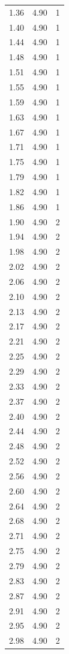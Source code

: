 \begin{longtable}{lrr}
  1.36 & 4.90 & 1 \\
  1.40 & 4.90 & 1 \\
  1.44 & 4.90 & 1 \\
  1.48 & 4.90 & 1 \\
  1.51 & 4.90 & 1 \\
  1.55 & 4.90 & 1 \\
  1.59 & 4.90 & 1 \\
  1.63 & 4.90 & 1 \\
  1.67 & 4.90 & 1 \\
  1.71 & 4.90 & 1 \\
  1.75 & 4.90 & 1 \\
  1.79 & 4.90 & 1 \\
  1.82 & 4.90 & 1 \\
  1.86 & 4.90 & 1 \\
  1.90 & 4.90 & 2 \\
  1.94 & 4.90 & 2 \\
  1.98 & 4.90 & 2 \\
  2.02 & 4.90 & 2 \\
  2.06 & 4.90 & 2 \\
  2.10 & 4.90 & 2 \\
  2.13 & 4.90 & 2 \\
  2.17 & 4.90 & 2 \\
  2.21 & 4.90 & 2 \\
  2.25 & 4.90 & 2 \\
  2.29 & 4.90 & 2 \\
  2.33 & 4.90 & 2 \\
  2.37 & 4.90 & 2 \\
  2.40 & 4.90 & 2 \\
  2.44 & 4.90 & 2 \\
  2.48 & 4.90 & 2 \\
  2.52 & 4.90 & 2 \\
  2.56 & 4.90 & 2 \\
  2.60 & 4.90 & 2 \\
  2.64 & 4.90 & 2 \\
  2.68 & 4.90 & 2 \\
  2.71 & 4.90 & 2 \\
  2.75 & 4.90 & 2 \\
  2.79 & 4.90 & 2 \\
  2.83 & 4.90 & 2 \\
  2.87 & 4.90 & 2 \\
  2.91 & 4.90 & 2 \\
  2.95 & 4.90 & 2 \\
  2.98 & 4.90 & 2 \\

\end{longtable}
